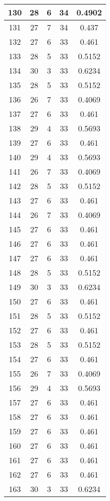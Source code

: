 \documentclass[letterpaper, 12pt]{article}
\begin{document}
\begin{longtable}{|c|c|c|c|c|}
\hline
130 & 28 & 6 & 34 & 0.4902 \\
\hline
131 & 27 & 7 & 34 & 0.437 \\
\hline
132 & 27 & 6 & 33 & 0.461 \\
\hline
133 & 28 & 5 & 33 & 0.5152 \\
\hline
134 & 30 & 3 & 33 & 0.6234 \\
\hline
135 & 28 & 5 & 33 & 0.5152 \\
\hline
136 & 26 & 7 & 33 & 0.4069 \\
\hline
137 & 27 & 6 & 33 & 0.461 \\
\hline
138 & 29 & 4 & 33 & 0.5693 \\
\hline
139 & 27 & 6 & 33 & 0.461 \\
\hline
140 & 29 & 4 & 33 & 0.5693 \\
\hline
141 & 26 & 7 & 33 & 0.4069 \\
\hline
142 & 28 & 5 & 33 & 0.5152 \\
\hline
143 & 27 & 6 & 33 & 0.461 \\
\hline
144 & 26 & 7 & 33 & 0.4069 \\
\hline
145 & 27 & 6 & 33 & 0.461 \\
\hline
146 & 27 & 6 & 33 & 0.461 \\
\hline
147 & 27 & 6 & 33 & 0.461 \\
\hline
148 & 28 & 5 & 33 & 0.5152 \\
\hline
149 & 30 & 3 & 33 & 0.6234 \\
\hline
150 & 27 & 6 & 33 & 0.461 \\
\hline
151 & 28 & 5 & 33 & 0.5152 \\
\hline
152 & 27 & 6 & 33 & 0.461 \\
\hline
153 & 28 & 5 & 33 & 0.5152 \\
\hline
154 & 27 & 6 & 33 & 0.461 \\
\hline
155 & 26 & 7 & 33 & 0.4069 \\
\hline
156 & 29 & 4 & 33 & 0.5693 \\
\hline
157 & 27 & 6 & 33 & 0.461 \\
\hline
158 & 27 & 6 & 33 & 0.461 \\
\hline
159 & 27 & 6 & 33 & 0.461 \\
\hline
160 & 27 & 6 & 33 & 0.461 \\
\hline
161 & 27 & 6 & 33 & 0.461 \\
\hline
162 & 27 & 6 & 33 & 0.461 \\
\hline
163 & 30 & 3 & 33 & 0.6234 \\

\end{longtable}
\end{document}
